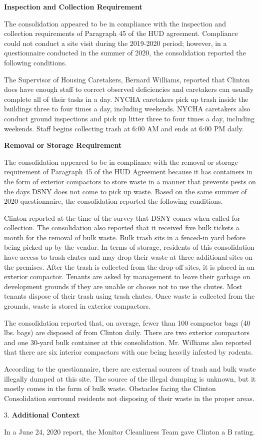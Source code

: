 

\textbf{Inspection and Collection Requirement}

The consolidation appeared to be in compliance with the inspection and collection requirements of Paragraph 45 of the HUD agreement. Compliance could not conduct a site visit during the 2019-2020 period; however, in a questionnaire conducted in the summer of 2020, the consolidation reported the following conditions.

The Supervisor of Housing Caretakers, Bernard Williams, reported that Clinton does have enough staff to correct observed deficiencies and caretakers can usually complete all of their tasks in a day. NYCHA caretakers pick up trash inside the buildings three to four times a day, including weekends. NYCHA caretakers also conduct ground inspections and pick up litter three to four times a day, including weekends. Staff begins collecting trash at 6:00 AM and ends at 6:00 PM daily. 

\textbf{Removal or Storage Requirement}

The consolidation appeared to be in compliance with the  removal or storage requirement of Paragraph  45 of the HUD Agreement because it has containers in the form of exterior compactors to store waste in a manner that prevents pests on the days DSNY does not come to pick up waste. Based on the same summer of  2020 questionnaire, the consolidation reported the following conditions.

Clinton reported at the time of the survey that DSNY comes when called for collection. The consolidation also reported that it received five bulk tickets a month for the removal of bulk waste. Bulk trash sits in a fenced-in yard before being picked up by the vendor. In terms of storage, residents of this consolidation have access to trash chutes and may drop their waste at three additional sites on the premises. After the trash is collected from the drop-off sites, it is placed in an exterior compactor. Tenants are asked by management to leave their garbage on development grounds if they are unable or choose not to use the chutes. Most tenants dispose of their trash using trash chutes. Once waste is collected from the grounds, waste is stored in exterior compactors. 

The consolidation reported that, on average, fewer than 100 compactor bags (40 lbs. bags)  are disposed of from Clinton daily. There are two exterior compactors and one 30-yard bulk container at this consolidation. Mr. Williams also reported that there are six interior compactors with one being heavily infested by rodents.

 According to the questionnaire, there are external sources of trash and bulk waste illegally dumped at this site. The source of the illegal dumping is unknown, but it mostly comes in the form of bulk waste. Obstacles facing the Clinton Consolidation surround residents not disposing of their waste in the proper areas.

3. \textbf{Additional Context} 

In a June 24, 2020 report, the Monitor Cleanliness Team gave Clinton a B rating. 
